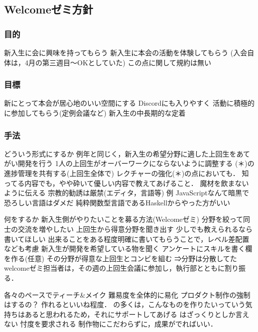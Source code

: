 \subsection*{Welcomeゼミ方針}


\subsubsection*{目的}
新入生に会に興味を持ってもらう 
新入生に本会の活動を体験してもらう
(入会自体は，4月の第三週目～OKとしていた)
この点に関して規約は無い

\subsubsection*{目標}
新\firstGrade{}にとって本会が居心地のいい空間にする
Discordにも入りやすく
活動に積極的に参加してもらう(定例会議など)
新入生の中長期的な定着


\subsubsection*{手法}
    どういう形式にするか
        例年と同じく，新入生の希望分野に適した上回生をあてがい開発を行う
        1人の上回生がオーバーワークにならないように調整する
        (＊)\firstGrade{}の進捗管理を共有する(上回生全体で)
        レクチャーの強化(＊)の点においても．
        知ってる内容でも，やや砕いて優しい内容で教えてあげること．
        魔材を飲まないように伝える
        宗教的勧誘は厳禁(エディタ，言語等)
            例
            JavaScriptなんて暗黒で恐ろしい言語はダメだ
            純粋関数型言語であるHaskellからやった方がいい

    何をするか
        新入生側がやりたいことを募る方法(Welcomeゼミ)
            分野を絞って\firstGrade{}同士の交流を増やしたい
            上回生から得意分野を聞き出す
        少しでも教えられるなら書いてほしい
            出来ることをある程度明確に書いてもらうことで，レベル差配置なども考慮
        新入生が開発を希望している物を聞く
            アンケートにスキルを書く欄を作る(任意)
        その分野が得意な上回生とコンビを組む
            ⇒分野は分散してた
            welcomeゼミ担当者は，その週の上回生会議に参加し，執行部とともに割り振る．

        各々のペースでティーチ&メイク
            難易度を全体的に易化
            プロダクト制作の強制はするの？
            作れるといいね程度．
                \firstGrade{}の多くは，こんなものを作りたいっていう気持ちはあると思われるため，それにサポートしてあげる
                \firstGrade{}はざっくりとしか言えない
                忖度を要求される
                制作物にこだわらずに，成果がでればいい．

